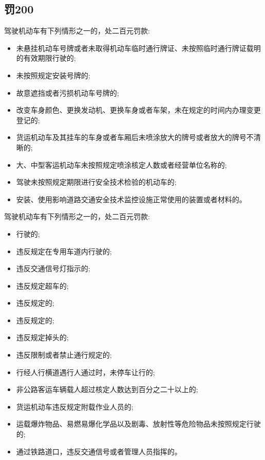 \subsection*{罚200}

\noindent 驾驶机动车有下列情形之一的，处二百元罚款:

\begin{itemize}
    \item 未悬挂机动车号牌或者未取得机动车临时通行牌证、未按照临时通行牌证载明的有效期限行驶的;
    \item 未按照规定安装号牌的;
    \item 故意遮挡或者污损机动车号牌的;
    \item 改变车身颜色、更换发动机、更换车身或者车架，未在规定的时间内办理变更登记的;
    \item 货运机动车及其挂车的车身或者车厢后未喷涂放大的牌号或者放大的牌号不清晰的;
    \item 大、中型客运机动车未按照规定喷涂核定人数或者经营单位名称的;
    \item 驾驶未按照规定期限进行安全技术检验的机动车的;
    \item 安装、使用影响道路交通安全技术监控设施正常使用的装置或者材料的。
\end{itemize}

\noindent 驾驶机动车有下列情形之一的，处二百元罚款:

\begin{itemize}
    \item {}行驶的;
    \item 违反规定在专用车道内行驶的;
    \item 违反交通信号灯指示的;
    \item 违反规定超车的;
    \item 违反规定的;
    \item 违反规定的;
    \item 违反规定掉头的;
    \item 违反限制或者禁止通行规定的;
    \item 行经人行横道遇行人通过时，未停车让行的;
    \item 非公路客运车辆载人超过核定人数达到百分之二十以上的;
    \item 货运机动车违反规定附载作业人员的;
    \item 运载爆炸物品、易燃易爆化学品以及剧毒、放射性等危险物品未按照规定行驶的;
    \item 通过铁路道口，违反交通信号或者管理人员指挥的。
\end{itemize}


